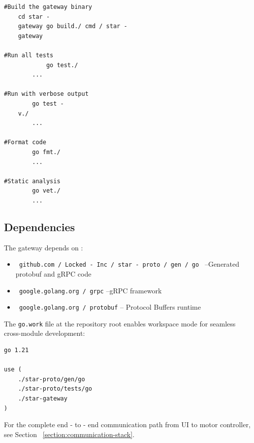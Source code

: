 \begin{verbatim}
#Build the gateway binary
    cd star -
    gateway go build./ cmd / star -
    gateway

#Run all tests
            go test./
        ...

#Run with verbose output
        go test -
    v./
        ...

#Format code
        go fmt./
        ...

#Static analysis
        go vet./
        ...
\end{verbatim}

\subsection{Dependencies}

The gateway depends on :

\begin{itemize}[leftmargin = 1.5em, topsep = 4pt, itemsep = 2pt]
    \item \texttt {
  github.com / Locked - Inc / star - proto / gen / go
}
--Generated protobuf and gRPC code
    \item \texttt { google.golang.org / grpc}
--gRPC framework
    \item \texttt { google.golang.org / protobuf} -- Protocol Buffers runtime
\end{itemize}

The \texttt{go.work} file at the repository root enables workspace mode for seamless cross-module development:

\begin{verbatim}
go 1.21

use (
    ./star-proto/gen/go
    ./star-proto/tests/go
    ./star-gateway
)
\end{verbatim}

\noindent For the complete end - to -
    end communication path from UI to motor controller,
    see Section ~\ref{section:communication-stack}.
